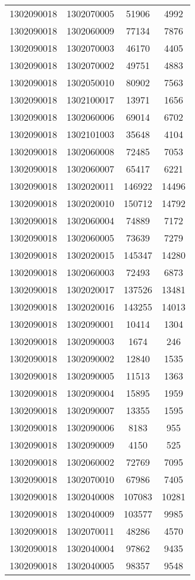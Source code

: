\begin{longtable}{llcc}
1302090018 & 1302070005 & 51906 & 4992\\
1302090018 & 1302060009 & 77134 & 7876\\
1302090018 & 1302070003 & 46170 & 4405\\
1302090018 & 1302070002 & 49751 & 4883\\
1302090018 & 1302050010 & 80902 & 7563\\
1302090018 & 1302100017 & 13971 & 1656\\
1302090018 & 1302060006 & 69014 & 6702\\
1302090018 & 1302101003 & 35648 & 4104\\
1302090018 & 1302060008 & 72485 & 7053\\
1302090018 & 1302060007 & 65417 & 6221\\
1302090018 & 1302020011 & 146922 & 14496\\
1302090018 & 1302020010 & 150712 & 14792\\
1302090018 & 1302060004 & 74889 & 7172\\
1302090018 & 1302060005 & 73639 & 7279\\
1302090018 & 1302020015 & 145347 & 14280\\
1302090018 & 1302060003 & 72493 & 6873\\
1302090018 & 1302020017 & 137526 & 13481\\
1302090018 & 1302020016 & 143255 & 14013\\
1302090018 & 1302090001 & 10414 & 1304\\
1302090018 & 1302090003 & 1674 & 246\\
1302090018 & 1302090002 & 12840 & 1535\\
1302090018 & 1302090005 & 11513 & 1363\\
1302090018 & 1302090004 & 15895 & 1959\\
1302090018 & 1302090007 & 13355 & 1595\\
1302090018 & 1302090006 & 8183 & 955\\
1302090018 & 1302090009 & 4150 & 525\\
1302090018 & 1302060002 & 72769 & 7095\\
1302090018 & 1302070010 & 67986 & 7405\\
1302090018 & 1302040008 & 107083 & 10281\\
1302090018 & 1302040009 & 103577 & 9985\\
1302090018 & 1302070011 & 48286 & 4570\\
1302090018 & 1302040004 & 97862 & 9435\\
1302090018 & 1302040005 & 98357 & 9548\\

\end{longtable}
